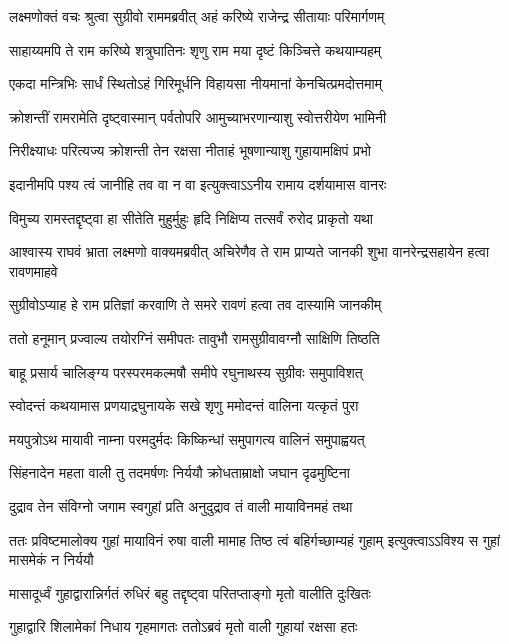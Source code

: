 \twolineshloka
{लक्ष्मणोक्तं वचः श्रुत्वा सुग्रीवो राममब्रवीत्}
{अहं करिष्ये राजेन्द्र सीतायाः परिमार्गणम्} %

\twolineshloka
{साहाय्यमपि ते राम करिष्ये शत्रुघातिनः}
{शृणु राम मया दृष्टं किञ्चित्ते कथयाम्यहम्} %

\twolineshloka
{एकदा मन्त्रिभिः सार्धं स्थितोऽहं गिरिमूर्धनि}
{विहायसा नीयमानां केनचित्प्रमदोत्तमाम्} %

\twolineshloka
{क्रोशन्तीं रामरामेति दृष्ट्वास्मान् पर्वतोपरि}
{आमुच्याभरणान्याशु स्वोत्तरीयेण भामिनी} %

\twolineshloka
{निरीक्ष्याधः परित्यज्य क्रोशन्ती तेन रक्षसा}
{नीताहं भूषणान्याशु गुहायामक्षिपं प्रभो} %

\twolineshloka
{इदानीमपि पश्य त्वं जानीहि तव वा न वा}
{इत्युक्त्वाऽऽनीय रामाय दर्शयामास वानरः} %

\twolineshloka
{विमुच्य रामस्तद्दृष्ट्वा हा सीतेति मुहुर्मुहुः}
{हृदि निक्षिप्य तत्सर्वं रुरोद प्राकृतो यथा} %

\threelineshloka
{आश्वास्य राघवं भ्राता लक्ष्मणो वाक्यमब्रवीत्}
{अचिरेणैव ते राम प्राप्यते जानकी शुभा}
{वानरेन्द्रसहायेन हत्वा रावणमाहवे} %

\twolineshloka
{सुग्रीवोऽप्याह हे राम प्रतिज्ञां करवाणि ते}
{समरे रावणं हत्वा तव दास्यामि जानकीम्} %

\twolineshloka
{ततो हनूमान् प्रज्वाल्य तयोरग्निं समीपतः}
{तावुभौ रामसुग्रीवावग्नौ साक्षिणि तिष्ठति} %

\twolineshloka
{बाहू प्रसार्य चालिङ्ग्य परस्परमकल्मषौ}
{समीपे रघुनाथस्य सुग्रीवः समुपाविशत्} %

\twolineshloka
{स्वोदन्तं कथयामास प्रणयाद्रघुनायके}
{सखे शृणु ममोदन्तं वालिना यत्कृतं पुरा} %

\twolineshloka
{मयपुत्रोऽथ मायावी नाम्ना परमदुर्मदः}
{किष्किन्धां समुपागत्य वालिनं समुपाह्वयत्} %

\twolineshloka
{सिंहनादेन महता वाली तु तदमर्षणः}
{निर्ययौ क्रोधताम्राक्षो जघान दृढमुष्टिना} %

\twolineshloka
{दुद्राव तेन संविग्नो जगाम स्वगुहां प्रति}
{अनुदुद्राव तं वाली मायाविनमहं तथा} %

\threelineshloka
{ततः प्रविष्टमालोक्य गुहां मायाविनं रुषा}
{वाली मामाह तिष्ठ त्वं बहिर्गच्छाम्यहं गुहाम्}
{इत्युक्त्वाऽऽविश्य स गुहां मासमेकं न निर्ययौ} %

\twolineshloka
{मासादूर्ध्वं गुहाद्वारान्निर्गतं रुधिरं बहु}
{तद्दृष्ट्वा परितप्ताङ्गो मृतो वालीति दुःखितः} %

\twolineshloka
{गुहाद्वारि शिलामेकां निधाय गृहमागतः}
{ततोऽब्रवं मृतो वाली गुहायां रक्षसा हतः} %

